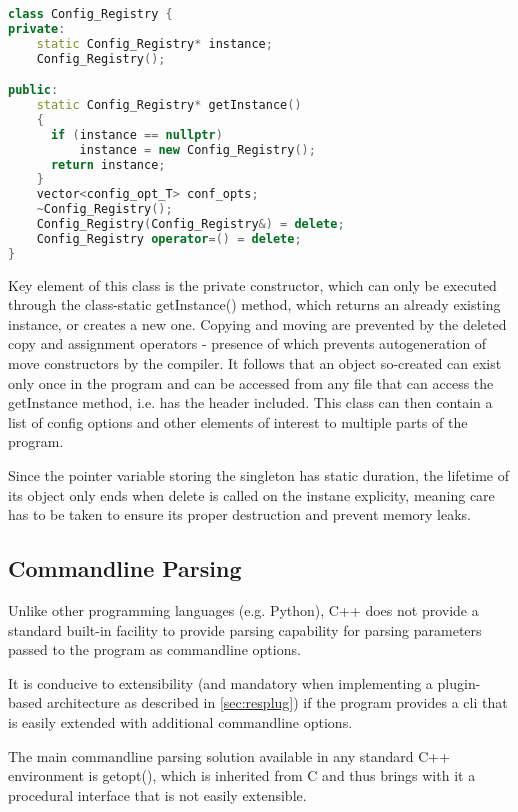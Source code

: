 \begin{lstlisting}[caption=Singleton Implementation in C++, language=c++]
class Config_Registry {
private:
    static Config_Registry* instance; 
    Config_Registry();

public:
    static Config_Registry* getInstance()
    {
      if (instance == nullptr)
          instance = new Config_Registry();
      return instance;
    }
    vector<config_opt_T> conf_opts;
    ~Config_Registry();
    Config_Registry(Config_Registry&) = delete;
    Config_Registry operator=() = delete;
}

\end{lstlisting}
Key element of this class is the private constructor, which can only be executed through the class-static getInstance() method, which returns an already existing instance, or creates a new one.
Copying and moving are prevented by the deleted copy and assignment operators - presence of which prevents autogeneration of move constructors by the compiler.
It follows that an object so-created can exist only once in the program and can be accessed from any file that can access the getInstance method, i.e. has the header included. 
This class can then contain a list of config options and other elements of interest to multiple parts of the program. 

Since the pointer variable storing the singleton has static duration, the lifetime of its object only ends when delete is called on the instane explicity, meaning care has to be taken to ensure its proper destruction and prevent memory leaks.

\subsection{Commandline Parsing}
Unlike other programming languages (e.g. Python), C++ does not provide a standard built-in facility to provide parsing capability for parsing parameters passed to the program as commandline options.

It is conducive to extensibility (and mandatory when implementing a plugin-based architecture as described in \ref{sec:resplug}) if the program provides a \gls{cli} that is easily extended with additional commandline options.

The main commandline parsing solution available in any standard C++ environment is getopt(), which is inherited from C and thus brings with it a procedural interface that is not easily extensible.

